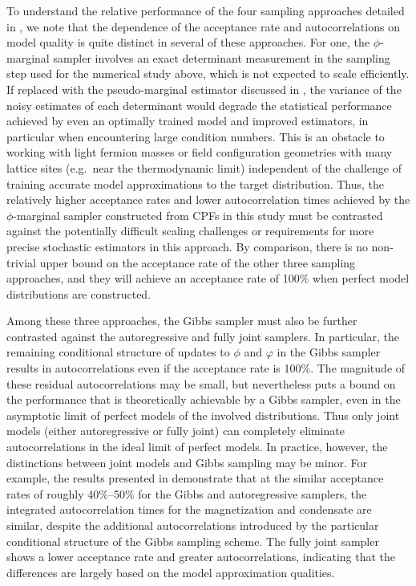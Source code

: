 \documentclass[aps,prd,twocolumn,nofootinbib,superscriptaddress,preprintnumbers]{revtex4-1}
\begin{document}
To understand the relative performance of the four sampling approaches detailed in , we note that the dependence of the acceptance rate and autocorrelations on model quality is quite distinct in several of these approaches. For one, the $\phi$-marginal sampler involves an exact determinant measurement in the sampling step used for the numerical study above, which is not expected to scale efficiently. If replaced with the pseudo-marginal estimator discussed in , the variance of the noisy estimates of each determinant would degrade the statistical performance achieved by even an optimally trained model and improved estimators, in particular when encountering large condition numbers. This is an obstacle to working with light fermion masses or field configuration geometries with many lattice sites (e.g.~near the thermodynamic limit) independent of the challenge of training accurate model approximations to the target distribution. Thus, the relatively higher acceptance rates and lower autocorrelation times achieved by the $\phi$-marginal sampler constructed from CPFs in this study must be contrasted against the potentially difficult scaling challenges or requirements for more precise stochastic estimators in this approach. By comparison, there is no non-trivial upper bound on the acceptance rate of the other three sampling approaches, and they will achieve an acceptance rate of 100\% when perfect model distributions are constructed.

Among these three approaches, the Gibbs sampler must also be further contrasted against the autoregressive and fully joint samplers. In particular, the remaining conditional structure of updates to $\phi$ and $\varphi$ in the Gibbs sampler results in autocorrelations even if the acceptance rate is 100\%. The magnitude of these residual autocorrelations may be small, but nevertheless puts a bound on the performance that is theoretically achievable by a Gibbs sampler, even in the asymptotic limit of perfect models of the involved distributions. Thus only joint models (either autoregressive or fully joint) can completely eliminate autocorrelations in the ideal limit of perfect models. In practice, however, the distinctions between joint models and Gibbs sampling may be minor. For example, the results presented in  demonstrate that at the similar acceptance rates of roughly 40\%--50\% for the Gibbs and autoregressive samplers, the integrated autocorrelation times for the magnetization and condensate are similar, despite the additional autocorrelations introduced by the particular conditional structure of the Gibbs sampling scheme. The fully joint sampler shows a lower acceptance rate and greater autocorrelations, indicating that the differences are largely based on the model approximation qualities.
\end{document}
